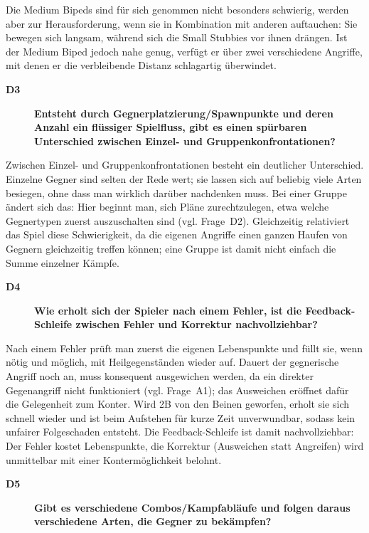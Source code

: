 \documentclass[../Main.tex]{subfiles}
\begin{document}
Die Medium Bipeds sind für sich genommen nicht besonders schwierig, werden aber zur Herausforderung, wenn sie in Kombination mit anderen auftauchen: Sie bewegen sich langsam, während sich die Small Stubbies vor ihnen drängen. Ist der Medium Biped jedoch nahe genug, verfügt er über zwei verschiedene Angriffe, mit denen er die verbleibende Distanz schlagartig überwindet.

\begin{description}
    \item[\textbf{D3}] \textbf{Entsteht durch Gegnerplatzierung/Spawnpunkte und deren Anzahl ein flüssiger Spielfluss, gibt es einen spürbaren Unterschied zwischen Einzel- und Gruppenkonfrontationen?}
\end{description}

Zwischen Einzel- und Gruppenkonfrontationen besteht ein deutlicher Unterschied. Einzelne Gegner sind selten der Rede wert; sie lassen sich auf beliebig viele Arten besiegen, ohne dass man wirklich darüber nachdenken muss. Bei einer Gruppe ändert sich das: Hier beginnt man, sich Pläne zurechtzulegen, etwa welche Gegnertypen zuerst auszuschalten sind (vgl. Frage~D2). Gleichzeitig relativiert das Spiel diese Schwierigkeit, da die eigenen Angriffe einen ganzen Haufen von Gegnern gleichzeitig treffen können; eine Gruppe ist damit nicht einfach die Summe einzelner Kämpfe.

\begin{description}
    \item[\textbf{D4}] \textbf{Wie erholt sich der Spieler nach einem Fehler, ist die Feedback-Schleife zwischen Fehler und Korrektur nachvollziehbar?}
\end{description}

Nach einem Fehler prüft man zuerst die eigenen Lebenspunkte und füllt sie, wenn nötig und möglich, mit Heilgegenständen wieder auf. Dauert der gegnerische Angriff noch an, muss konsequent ausgewichen werden, da ein direkter Gegenangriff nicht funktioniert (vgl. Frage~A1); das Ausweichen eröffnet dafür die Gelegenheit zum Konter. Wird 2B von den Beinen geworfen, erholt sie sich schnell wieder und ist beim Aufstehen für kurze Zeit unverwundbar, sodass kein unfairer Folgeschaden entsteht. Die Feedback-Schleife ist damit nachvollziehbar: Der Fehler kostet Lebenspunkte, die Korrektur (Ausweichen statt Angreifen) wird unmittelbar mit einer Kontermöglichkeit belohnt.

\begin{description}
    \item[\textbf{D5}] \textbf{Gibt es verschiedene Combos/Kampfabläufe und folgen daraus verschiedene Arten, die Gegner zu bekämpfen?}
\end{description}
\end{document}
